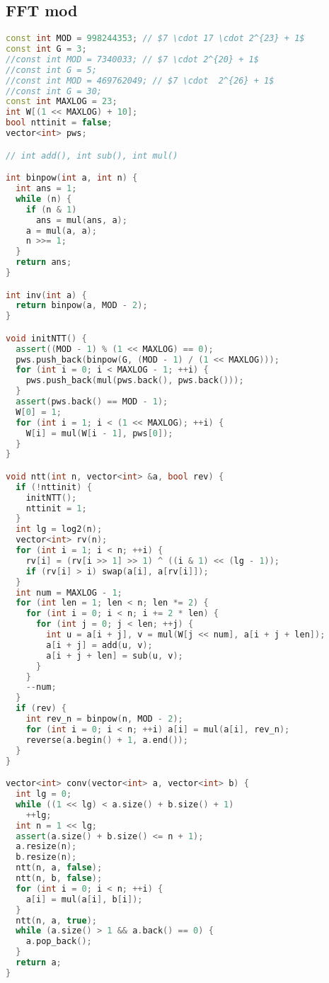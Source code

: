 \documentclass[9pt,a4paper,landscape,twosided]{extarticle}
\begin{document}
\begin{multicols*}{3}
\begin{lstlisting}[language=C++]
\end{lstlisting}

\subsection{FFT mod}
\begin{lstlisting}[language=C++]
const int MOD = 998244353; // $7 \cdot 17 \cdot 2^{23} + 1$
const int G = 3;
//const int MOD = 7340033; // $7 \cdot 2^{20} + 1$
//const int G = 5;
//const int MOD = 469762049; // $7 \cdot  2^{26} + 1$
//const int G = 30;
const int MAXLOG = 23;
int W[(1 << MAXLOG) + 10];
bool nttinit = false;
vector<int> pws;

// int add(), int sub(), int mul()

int binpow(int a, int n) {
  int ans = 1;
  while (n) {
    if (n & 1)
      ans = mul(ans, a);
    a = mul(a, a);
    n >>= 1;
  }
  return ans;
}

int inv(int a) {
  return binpow(a, MOD - 2);
}

void initNTT() {
  assert((MOD - 1) % (1 << MAXLOG) == 0);
  pws.push_back(binpow(G, (MOD - 1) / (1 << MAXLOG)));
  for (int i = 0; i < MAXLOG - 1; ++i) {
    pws.push_back(mul(pws.back(), pws.back()));
  }
  assert(pws.back() == MOD - 1);
  W[0] = 1;
  for (int i = 1; i < (1 << MAXLOG); ++i) {
    W[i] = mul(W[i - 1], pws[0]);
  }
}

void ntt(int n, vector<int> &a, bool rev) {
  if (!nttinit) {
    initNTT();
    nttinit = 1;
  }
  int lg = log2(n);
  vector<int> rv(n);
  for (int i = 1; i < n; ++i) {
    rv[i] = (rv[i >> 1] >> 1) ^ ((i & 1) << (lg - 1));
    if (rv[i] > i) swap(a[i], a[rv[i]]);
  }
  int num = MAXLOG - 1;
  for (int len = 1; len < n; len *= 2) {
    for (int i = 0; i < n; i += 2 * len) {
      for (int j = 0; j < len; ++j) {
        int u = a[i + j], v = mul(W[j << num], a[i + j + len]);
        a[i + j] = add(u, v);
        a[i + j + len] = sub(u, v);
      }
    }
    --num;
  }
  if (rev) {
    int rev_n = binpow(n, MOD - 2);
    for (int i = 0; i < n; ++i) a[i] = mul(a[i], rev_n);
    reverse(a.begin() + 1, a.end());
  }
}

vector<int> conv(vector<int> a, vector<int> b) {
  int lg = 0;
  while ((1 << lg) < a.size() + b.size() + 1)
    ++lg;
  int n = 1 << lg;
  assert(a.size() + b.size() <= n + 1);
  a.resize(n);
  b.resize(n);
  ntt(n, a, false);
  ntt(n, b, false);
  for (int i = 0; i < n; ++i) {
    a[i] = mul(a[i], b[i]);
  }
  ntt(n, a, true);
  while (a.size() > 1 && a.back() == 0) {
    a.pop_back();
  }
  return a;
}


\end{lstlisting}
\end{multicols*}
\end{document}
